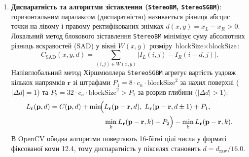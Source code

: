 \documentclass[14pt, a4paper]{extarticle}
\begin{document}
\begin{enumerate}
    \item \textbf{Диспаратність та алгоритми зіставлення (\texttt{StereoBM}, \texttt{StereoSGBM})}: горизонтальним паралаксом (диспаратністю) називається різниця абсцис точки на лівому і правому ректифікованих знімках $d(x, y) = x_L - x_R > 0$. Локальний метод блокового зіставлення \texttt{StereoBM} мінімізує суму абсолютних різниць яскравостей (SAD) у вікні $W(x, y)$ розміру $\text{blockSize} \times \text{blockSize}$:
    \begin{equation}\label{eq:sad}
        C_{\text{SAD}}(x, y, d) = \sum_{(i, j) \in W(x, y)} \left| I_L(i, j) - I_R(i - d, j) \right|.
    \end{equation}
    Напівглобальний метод Хіршмюллера \texttt{StereoSGBM} агрегує вартість уздовж кількох напрямків $\mathbf{r}$ зі штрафами $P_1 = 8 \cdot c_n \cdot \text{blockSize}^2$ за нахил поверхні ($|\Delta d| = 1$) та $P_2 = 32 \cdot c_n \cdot \text{blockSize}^2 > P_1$ за розрив глибини ($|\Delta d| > 1$):
    \begin{equation}\label{eq:sgbm}
    \begin{split}
        L_{\mathbf{r}}(\mathbf{p}, d) = C(\mathbf{p}, d) + \min \!\Bigl( & L_{\mathbf{r}}(\mathbf{p}-\mathbf{r}, d), \; L_{\mathbf{r}}(\mathbf{p}-\mathbf{r}, d \pm 1) + P_1, \\
        & \min_k L_{\mathbf{r}}(\mathbf{p}-\mathbf{r}, k) + P_2 \Bigr) - \min_k L_{\mathbf{r}}(\mathbf{p}-\mathbf{r}, k).
    \end{split}
    \end{equation}
    В OpenCV обидва алгоритми повертають 16-бітні цілі числа у форматі фіксованої коми 12.4, тому диспаратність у пікселях становить $d = d_{\text{raw}} / 16.0$.


\end{enumerate}
\end{document}
